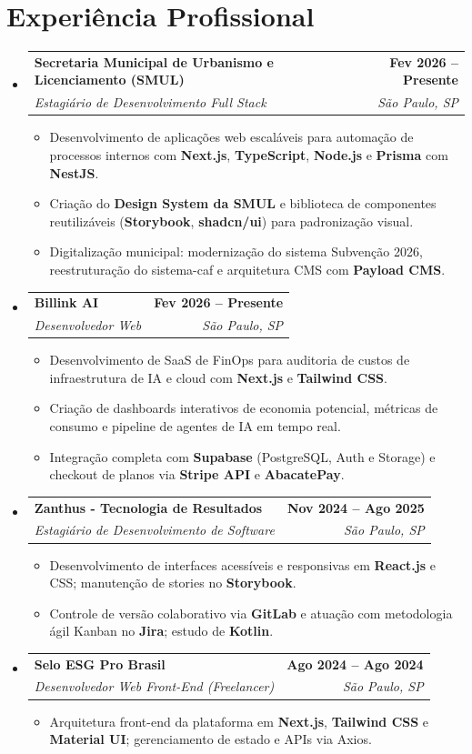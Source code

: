 \documentclass[a4paper,10pt]{article}
\makeatletter
\newcommand{\resumeItem}[1]{
  \item\small{#1}
}
\newcommand{\resumeSubheading}[4]{
  \vspace{1pt}\item[]
    \begin{tabular*}{1.0\textwidth}[t]{l@{\extracolsep{\fill}}r}
      \textbf{#1} & \textbf{\small #2} \\
      \textit{\small#3} & \textit{\small #4} \\
    \end{tabular*}\vspace{-4pt}
}
\makeatother
\begin{document}
\section{Experiência Profissional}
\begin{itemize}[leftmargin=0pt, label={}]

  \resumeSubheading
    {Secretaria Municipal de Urbanismo e Licenciamento (SMUL)}{Fev 2026 -- Presente}
    {Estagiário de Desenvolvimento Full Stack}{São Paulo, SP}
    \begin{itemize}[leftmargin=12pt]
      \resumeItem{Desenvolvimento de aplicações web escaláveis para automação de processos internos com \textbf{Next.js}, \textbf{TypeScript}, \textbf{Node.js} e \textbf{Prisma} com \textbf{NestJS}.}
      \resumeItem{Criação do \textbf{Design System da SMUL} e biblioteca de componentes reutilizáveis (\textbf{Storybook}, \textbf{shadcn/ui}) para padronização visual.}
      \resumeItem{Digitalização municipal: modernização do sistema Subvenção 2026, reestruturação do sistema-caf e arquitetura CMS com \textbf{Payload CMS}.}
    \end{itemize}

  \resumeSubheading
    {Billink AI}{Fev 2026 -- Presente}
    {Desenvolvedor Web}{São Paulo, SP}
    \begin{itemize}[leftmargin=12pt]
      \resumeItem{Desenvolvimento de SaaS de FinOps para auditoria de custos de infraestrutura de IA e cloud com \textbf{Next.js} e \textbf{Tailwind CSS}.}
      \resumeItem{Criação de dashboards interativos de economia potencial, métricas de consumo e pipeline de agentes de IA em tempo real.}
      \resumeItem{Integração completa com \textbf{Supabase} (PostgreSQL, Auth e Storage) e checkout de planos via \textbf{Stripe API} e \textbf{AbacatePay}.}
    \end{itemize}

  \resumeSubheading
    {Zanthus - Tecnologia de Resultados}{Nov 2024 -- Ago 2025}
    {Estagiário de Desenvolvimento de Software}{São Paulo, SP}
    \begin{itemize}[leftmargin=12pt]
      \resumeItem{Desenvolvimento de interfaces acessíveis e responsivas em \textbf{React.js} e CSS; manutenção de stories no \textbf{Storybook}.}
      \resumeItem{Controle de versão colaborativo via \textbf{GitLab} e atuação com metodologia ágil Kanban no \textbf{Jira}; estudo de \textbf{Kotlin}.}
    \end{itemize}

  \resumeSubheading
    {Selo ESG Pro Brasil}{Ago 2024 -- Ago 2024}
    {Desenvolvedor Web Front-End (Freelancer)}{São Paulo, SP}
    \begin{itemize}[leftmargin=12pt]
      \resumeItem{Arquitetura front-end da plataforma em \textbf{Next.js}, \textbf{Tailwind CSS} e \textbf{Material UI}; gerenciamento de estado e APIs via Axios.}
    \end{itemize}


\end{itemize}
\end{document}
